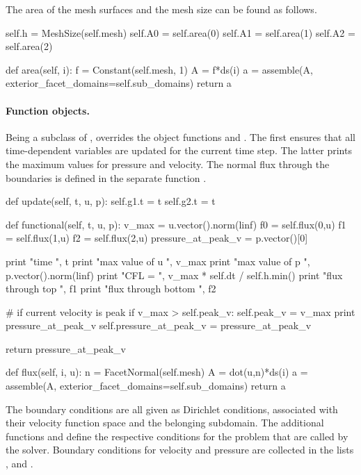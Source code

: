 The area of the mesh surfaces and the mesh size can be found as follows.
\begin{python}
	self.h = MeshSize(self.mesh)
	self.A0 = self.area(0)
	self.A1 = self.area(1)
	self.A2 = self.area(2)

def area(self, i):
	f = Constant(self.mesh, 1)
	A = f*ds(i)
	a = assemble(A, exterior_facet_domains=self.sub_domains)
	return a
\end{python}

\paragraph{Function objects.}
Being a subclass of ,  overrides the
object functions  and . The first ensures
that all time-dependent variables are updated for the current time
step. The latter prints the maximum values for pressure and
velocity. The normal flux through the boundaries is defined in the
separate function .
\begin{python}
def update(self, t, u, p):
	self.g1.t = t
	self.g2.t = t

def functional(self, t, u, p):
	v_max = u.vector().norm(linf)
	f0 = self.flux(0,u)
	f1 = self.flux(1,u)
	f2 = self.flux(2,u)
	pressure_at_peak_v = p.vector()[0]

	print "time ", t
	print "max value of u ", v_max
	print "max value of p ", p.vector().norm(linf)
	print "CFL = ", v_max * self.dt / self.h.min()
	print "flux through top ", f1
	print "flux through bottom ", f2

	# if current velocity is peak
	if v_max > self.peak_v:
		self.peak_v = v_max
		print pressure_at_peak_v
		self.pressure_at_peak_v = pressure_at_peak_v

	return pressure_at_peak_v

def flux(self, i, u):
	n = FacetNormal(self.mesh)
	A = dot(u,n)*ds(i)
	a = assemble(A, exterior_facet_domains=self.sub_domains)
	return a
\end{python}

The boundary conditions are all given as Dirichlet conditions,
associated with their velocity function space and the belonging
subdomain. The additional functions  and
 define the respective conditions for the
problem that are called by the solver. Boundary conditions for
velocity and pressure are collected in the lists ,
 and .

